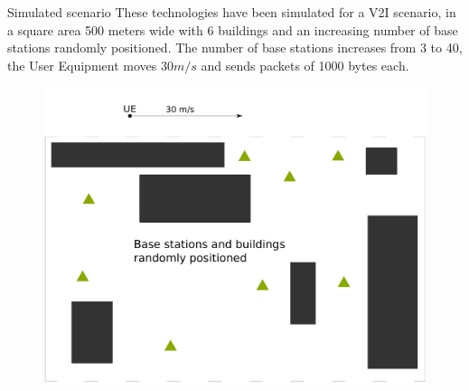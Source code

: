 \documentclass{beamer}
\begin{document}
	\begin{frame}{Simulated scenario}
		These technologies have been simulated for a V2I scenario, in a square area 500 meters wide with 6 buildings and an increasing number of base stations randomly positioned.\vspace{.5em}
		The number of base stations increases from 3 to 40, the User Equipment moves $30m/s$ and sends packets of 1000 bytes each.
		\begin{figure}
			\vspace{-0.1in}
			\includegraphics[scale=0.18]{scenario}
		\end{figure}
	\end{frame}
\end{document}
